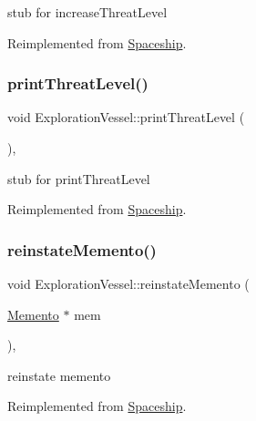 stub for increase\+Threat\+Level 

Reimplemented from \hyperlink{classSpaceship_a5ddf702124286d9d3a6b5e64c09515bc}{Spaceship}.

\mbox{\label{classExplorationVessel_af08a3db5b456781106f33a03bfbe7621}} 
\subsubsection{\texorpdfstring{print\+Threat\+Level()}{printThreatLevel()}}
{\footnotesize\ttfamily void Exploration\+Vessel\+::print\+Threat\+Level (\begin{DoxyParamCaption}{ }\end{DoxyParamCaption})\hspace{0.3cm}{\ttfamily [inline]}, {\ttfamily [virtual]}}

stub for print\+Threat\+Level 

Reimplemented from \hyperlink{classSpaceship_a8f16814f888a5a1423e5a491329cdb97}{Spaceship}.

\mbox{\label{classExplorationVessel_a314e19ec45f722d80adb800eb7b36d20}} 
\subsubsection{\texorpdfstring{reinstate\+Memento()}{reinstateMemento()}}
{\footnotesize\ttfamily void Exploration\+Vessel\+::reinstate\+Memento (\begin{DoxyParamCaption}\item[{\hyperlink{classMemento}{Memento} $\ast$}]{mem }\end{DoxyParamCaption})\hspace{0.3cm}{\ttfamily [inline]}, {\ttfamily [virtual]}}

reinstate memento 

Reimplemented from \hyperlink{classSpaceship_ab075c869473344b6471c8e28ca7ea61e}{Spaceship}.

\mbox{\label{classExplorationVessel_aeaec72883c8cc5b951be9dd8f4184515}} 
